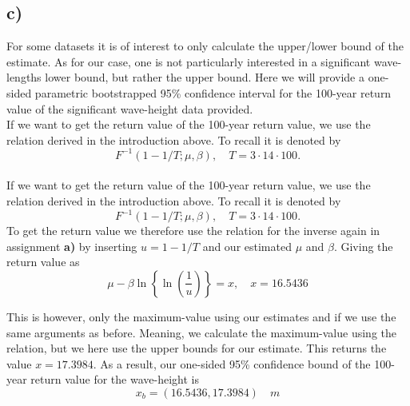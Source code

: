 \subsection*{c)}

For some datasets it is of interest to only calculate the upper/lower bound of the estimate. As for our case, one is not particularly interested in a significant wave-lengths lower bound, but rather the upper bound. Here we will provide a one-sided parametric bootstrapped 95\% confidence interval for the 100-year return value of the significant wave-height data provided. \\

If we want to get the return value of the 100-year return value, we use the relation derived in the introduction above. To recall it is denoted by
\[ F^{-1}(1-1/T;\mu,\beta), \quad T=3\cdot14\cdot100.\] \\

If we want to get the return value of the 100-year return value, we use the relation derived in the introduction above. To recall it is denoted by
\[ F^{-1}(1-1/T;\mu,\beta), \quad T=3\cdot14\cdot100.\]
To get the return value we therefore use the relation for the inverse again in assignment \textbf{a)} by inserting $u=1-1/T$ and our estimated $\mu$ and $\beta$. Giving the return value as
\[  \mu-\beta \ln \left \{\ln\left ( \frac{1}{u}\right ) \right \}=x,\quad x=16.5436\]

This is however, only the maximum-value using our estimates and if we use the same arguments as before. Meaning, we calculate the maximum-value using the relation, but we here use the upper bounds for our estimate. This returns the value $x=17.3984$. As a result, our one-sided 95\% confidence bound of the 100-year return value for the wave-height is 
\[ x_b=(16.5436,17.3984)\quad m \]
